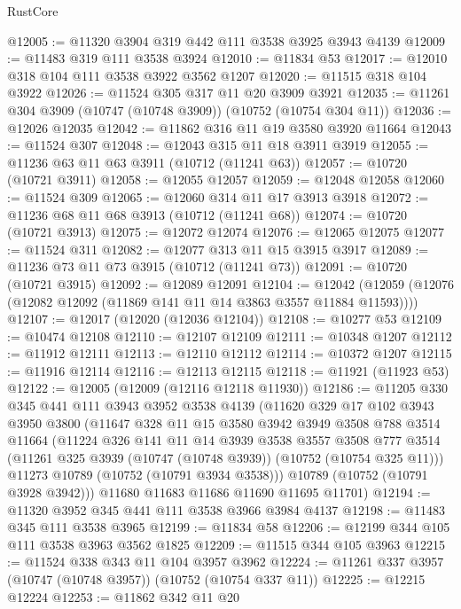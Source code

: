 \begin{lexlean}{RustCore}
\begin{coremodule}
@12005 := @11320 @3904 @319 @442 @111 @3538 @3925 @3943 @4139
@12009 := @11483 @319 @111 @3538 @3924
@12010 := @11834 @53
@12017 := @12010 @318 @104 @111 @3538 @3922 @3562 @1207
@12020 := @11515 @318 @104 @3922
@12026 := @11524 @305 @317 @11 @20 @3909 @3921
@12035 := @11261 @304 @3909 (@10747 (@10748 @3909)) (@10752 (@10754 @304 @11))
@12036 := @12026 @12035
@12042 := @11862 @316 @11 @19 @3580 @3920 @11664
@12043 := @11524 @307
@12048 := @12043 @315 @11 @18 @3911 @3919
@12055 := @11236 @63 @11 @63 @3911 (@10712 (@11241 @63))
@12057 := @10720 (@10721 @3911)
@12058 := @12055 @12057
@12059 := @12048 @12058
@12060 := @11524 @309
@12065 := @12060 @314 @11 @17 @3913 @3918
@12072 := @11236 @68 @11 @68 @3913 (@10712 (@11241 @68))
@12074 := @10720 (@10721 @3913)
@12075 := @12072 @12074
@12076 := @12065 @12075
@12077 := @11524 @311
@12082 := @12077 @313 @11 @15 @3915 @3917
@12089 := @11236 @73 @11 @73 @3915 (@10712 (@11241 @73))
@12091 := @10720 (@10721 @3915)
@12092 := @12089 @12091
@12104 := @12042 (@12059 (@12076 (@12082 @12092 (@11869 @141 @11 @14 @3863 @3557 @11884 @11593))))
@12107 := @12017 (@12020 (@12036 @12104))
@12108 := @10277 @53
@12109 := @10474 @12108
@12110 := @12107 @12109
@12111 := @10348 @1207
@12112 := @11912 @12111
@12113 := @12110 @12112
@12114 := @10372 @1207
@12115 := @11916 @12114
@12116 := @12113 @12115
@12118 := @11921 (@11923 @53)
@12122 := @12005 (@12009 (@12116 @12118 @11930))
@12186 := @11205
    @330
    @345
    @441
    @111
    @3943
    @3952
    @3538
    @4139
    (@11620
      @329
      @17
      @102
      @3943
      @3950
      @3800
      (@11647
        @328
        @11
        @15
        @3580
        @3942
        @3949
        @3508
        @788
        @3514
        @11664
        (@11224
          @326
          @141
          @11
          @14
          @3939
          @3538
          @3557
          @3508
          @777
          @3514
          (@11261 @325 @3939 (@10747 (@10748 @3939)) (@10752 (@10754 @325 @11)))
          @11273
          @10789
          (@10752 (@10791 @3934 @3538)))
        @10789
        (@10752 (@10791 @3928 @3942)))
      @11680
      @11683
      @11686
      @11690
      @11695
      @11701)
@12194 := @11320 @3952 @345 @441 @111 @3538 @3966 @3984 @4137
@12198 := @11483 @345 @111 @3538 @3965
@12199 := @11834 @58
@12206 := @12199 @344 @105 @111 @3538 @3963 @3562 @1825
@12209 := @11515 @344 @105 @3963
@12215 := @11524 @338 @343 @11 @104 @3957 @3962
@12224 := @11261 @337 @3957 (@10747 (@10748 @3957)) (@10752 (@10754 @337 @11))
@12225 := @12215 @12224
@12253 := @11862
    @342
    @11
    @20

\end{coremodule}
\end{lexlean}
